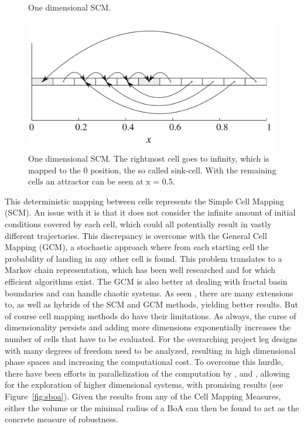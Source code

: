 \begin{figure}[h]
    \caption{One dimensional SCM.\cite{cell1}}
    \centering
    \includegraphics[width=.9\linewidth]{figures/1d-cm}
    \caption{One dimensional SCM. The rightmost cell goes to infinity, which is mapped to the 0 position, the so called sink-cell. With the remaining cells an attractor can be seen at x = 0.5. \cite{cell1}}
    \label{fig:1d-cm}
\end{figure}

This deterministic mapping between cells represents the Simple Cell Mapping (SCM). An issue with it is that it does not consider the infinite amount of initial conditions covered by each cell, which could all potentially result in vastly different trajectories. This discrepancy is overcome with the General Cell Mapping (GCM), a stochastic approach where from each starting cell the probability of landing in any other cell is found. This problem translates to a Markov chain representation, which has been well researched and for which efficient algorithms exist. The GCM is also better at dealing with fractal basin boundaries and can handle chaotic systems. As seen \cite{cell2}, there are many extensions to, as well as hybrids of the SCM and GCM methods, yielding better results. But of course cell mapping methods do have their limitations. 
As always, the curse of dimensionality persists and adding more dimensions exponentially increases the number of cells that have to be evaluated. For the overarching project leg designs with many degrees of freedom need to be analyzed, resulting in high dimensional phase spaces and increasing the computational cost. To overcome this hurdle, there have been efforts in parallelization of the computation by \cite{sixdim},\cite{parallel} and \cite{integr}, allowing for the exploration of higher dimensional systems, with promising results (see Figure~\ref{fig:sboa}). Given the results from any of the Cell Mapping Measures, either the volume or the minimal radius of a BoA can then be found to act as the concrete measure of robustness. 


